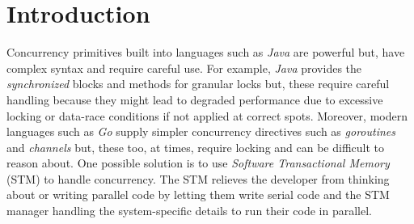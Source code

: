 \documentclass[../main]{subfiles}
\begin{document}
  \section{Introduction}
  \par
  Concurrency primitives built into languages such as {\em Java} are powerful but, have complex syntax and require careful use. For example, {\em Java} provides the {\em synchronized} blocks and methods for granular locks but, these require careful handling because they might lead to degraded performance due to excessive locking or data-race conditions if not applied at correct spots. Moreover, modern languages such as {\em Go} supply simpler concurrency directives such as {\em goroutines} and {\em channels} but, these too, at times, require locking and can be difficult to reason about. One possible solution is to use {\em Software Transactional Memory} (STM) to handle concurrency. The STM relieves the developer from thinking about or writing parallel code by letting them write serial code and the STM manager handling the system-specific details to run their code in parallel. \par
\end{document}
